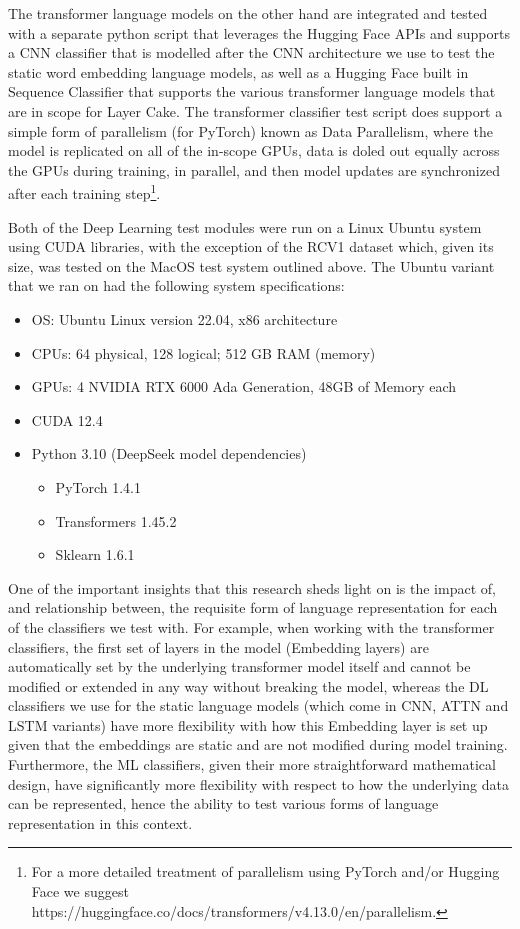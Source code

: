 \documentclass[final]{clv2025}
\begin{document}
The transformer language models on the other hand are integrated and tested with a separate python script that leverages the Hugging Face APIs and supports a CNN classifier that is modelled after the CNN architecture we use to test the static word embedding language models, as well as a Hugging Face built in Sequence Classifier that supports the various transformer language models that are in scope for Layer Cake.  The transformer classifier test script does support a simple form of parallelism (for PyTorch) known as Data Parallelism, where the model is replicated on all of the in-scope GPUs, data is doled out equally across the GPUs during training, in parallel, and then model updates are synchronized after each training step\footnote{For a more detailed treatment of parallelism using PyTorch and/or Hugging Face we suggest https://huggingface.co/docs/transformers/v4.13.0/en/parallelism.}.  

Both of the Deep Learning test modules were run on a Linux Ubuntu system using CUDA libraries, with the exception of the RCV1 dataset which, given its size, was tested on the MacOS test system outlined above. The Ubuntu variant that we ran on had the following system specifications:
\begin{itemize}
    \item 	OS: Ubuntu Linux version 22.04, x86 architecture
\item 	CPUs: 64 physical, 128 logical; 512 GB RAM (memory)
\item 	GPUs: 4 NVIDIA RTX 6000 Ada Generation, 48GB of Memory each
\item 	CUDA 12.4
\item 	Python 3.10 (DeepSeek model dependencies)
\begin{itemize}
    \item PyTorch 1.4.1 
\item Transformers 1.45.2 
\item 	Sklearn 1.6.1
\end{itemize}
\end{itemize}

One of the important insights that this research sheds light on is the impact of, and relationship between, the requisite form of language representation for each of the classifiers we test with. For example, when working with the transformer classifiers, the first set of layers in the model (Embedding layers) are automatically set by the underlying transformer model itself and cannot be modified or extended in any way without breaking the model, whereas the DL classifiers we use for the static language models (which come in CNN, ATTN and LSTM variants) have more flexibility with how this Embedding layer is set up given that the embeddings are static and are not modified during model training. Furthermore, the ML classifiers, given their more straightforward mathematical design, have significantly more flexibility with respect to how the underlying data can be represented, hence the ability to test various forms of language representation in this context. 
\end{document}
